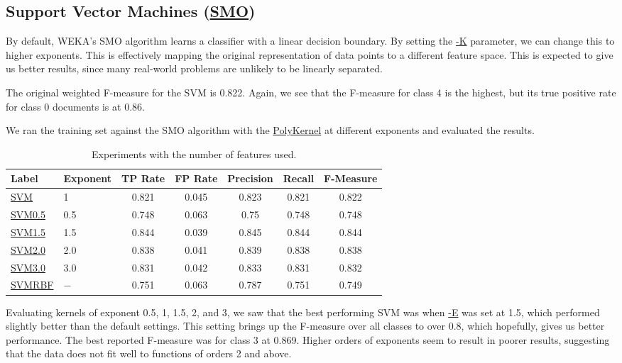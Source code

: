 \documentclass[12pt]{article}
\begin{document}
\subsection{Support Vector Machines (\url{SMO})}
By default, WEKA's SMO algorithm learns a classifier with a linear decision boundary. By setting the \url{-K} parameter, we can change this to higher exponents. This is effectively mapping the original representation of data points to a different feature space. This is expected to give us better results, since many real-world problems are unlikely to be linearly separated.

The original weighted F-measure for the SVM is 0.822. Again, we see that the F-measure for class 4 is the highest, but its true positive rate for class 0 documents is at 0.86.

We ran the training set against the SMO algorithm with the \url{PolyKernel} at different exponents and evaluated the results.
\begin{table}[h]
\centering
\begin{tabular}{|l |l|c c c c c|}
\hline
Label & Exponent	&	TP Rate & FP Rate & Precision & Recall  & F-Measure	 \\
\hline
\url{SVM} & 1	&		0.821 &    0.045 &     0.823   &   0.821   &   0.822  \\
\url{SVM0.5} & 0.5 &	0.748 &    0.063 &     0.75    &   0.748   &   0.748  \\   
\url{SVM1.5} & 1.5	&	0.844 &    0.039 &     0.845   &   0.844   &   0.844  \\
\url{SVM2.0} & 2.0	&	0.838 &    0.041 &     0.839   &   0.838   &   0.838  \\
\url{SVM3.0} & 3.0	&	0.831 &    0.042 &     0.833   &   0.831   &   0.832  \\
\url{SVMRBF} & $-$	&	0.751 &    0.063 &     0.787   &   0.751   &   0.749  \\

\hline
\end{tabular}
\caption{Experiments with the number of features used.}
\label{table:svm}
\end{table}

Evaluating kernels of exponent 0.5, 1, 1.5, 2, and 3, we saw that the best performing SVM was when \url{-E} was set at 1.5, which performed slightly better than the default settings. This setting brings up the F-measure over all classes to over 0.8, which hopefully, gives us better performance. The best reported F-measure was for class 3 at 0.869. Higher orders of exponents seem to result in poorer results, suggesting that the data does not fit well to functions of orders 2 and above. %
\end{document}
